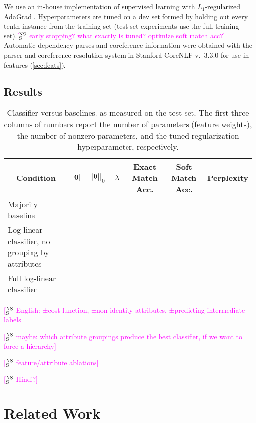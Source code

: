 \documentclass[11pt,letterpaper]{article}
\newcommand{\ensuretext}[1]{#1}
\newcommand{\nssmarker}{\ensuretext{\textcolor{magenta}{\ensuremath{^{\textsc{NS}}_{\textsc{S}}}}}}
\newcommand{\arkcomment}[3]{\ensuretext{\textcolor{#3}{[#1 #2]}}}
\newcommand{\nss}[1]{\arkcomment{\nssmarker}{#1}{magenta}}
\begin{document}
We use an in-house implementation of supervised learning with $L_1$-regularized AdaGrad \citep{adagrad}. 
Hyperparameters are tuned on a dev set formed by holding out every tenth instance from the training set 
(test set experiments use the full training set).\nss{early stopping? what exactly is tuned? optimize soft match acc?} 
Automatic dependency parses and coreference information were obtained with 
the parser and coreference resolution system in Stanford CoreNLP v.~3.3.0 \citep{socher-13,recasens-13}
for use in features (\cref{sec:feats}).

\subsection{Results}

\begin{table*}\small\centering
\begin{tabular}{@{}lrrrrrr@{}}
\multicolumn{1}{c}{\bf Condition} & \multicolumn{1}{c}{$|\boldsymbol{\theta}|$} & \multicolumn{1}{c}{$||\boldsymbol{\theta}||_0$} & \multicolumn{1}{c}{$\lambda$} 
& \multicolumn{1}{c}{\bf Exact Match Acc.} & \multicolumn{1}{c}{\bf Soft Match Acc.} 
& \multicolumn{1}{c}{\bf Perplexity} \\
\midrule
Majority baseline & \multicolumn{1}{c}{---} & \multicolumn{1}{c}{---} & \multicolumn{1}{c}{---} & \\
Log-linear classifier, no grouping by attributes & & \\
Full log-linear classifier & & \\
\end{tabular}
\caption{Classifier versus baselines, as measured on the test set. 
The first three columns of numbers report the number of parameters (feature weights), the number of nonzero parameters, 
and the tuned regularization hyperparameter, respectively.}
\label{tbl:results}
\end{table*}

\nss{English: ±cost function, ±non-identity attributes, ±predicting intermediate labels}

\nss{maybe: which attribute groupings produce the best classifier, if we want to force a hierarchy}

\nss{feature/attribute ablations}

\nss{Hindi?}

\section{Related Work}\label{sec:related}
\end{document}
